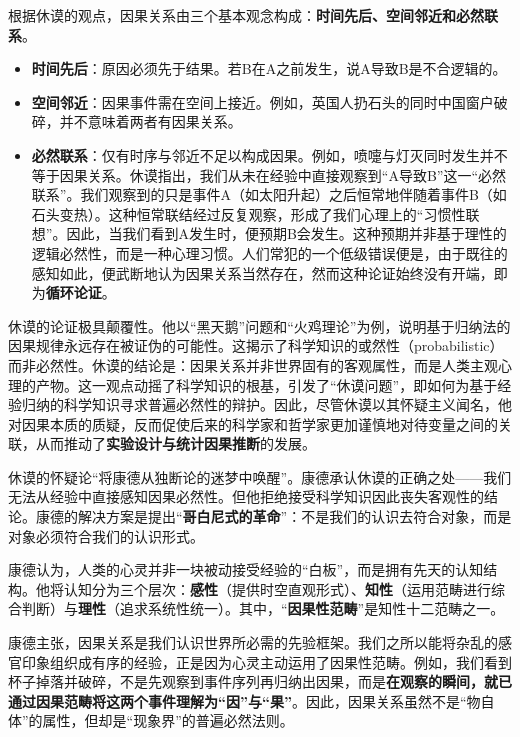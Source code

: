 根据休谟的观点，因果关系由三个基本观念构成：\textbf{时间先后、空间邻近和必然联系}。
	
\begin{itemize}
    \item
    \textbf{时间先后}：原因必须先于结果。若B在A之前发生，说A导致B是不合逻辑的。
    \item
    \textbf{空间邻近}：因果事件需在空间上接近。例如，英国人扔石头的同时中国窗户破碎，并不意味着两者有因果关系。
    \item
    \textbf{必然联系}：仅有时序与邻近不足以构成因果。例如，喷嚏与灯灭同时发生并不等于因果关系。休谟指出，我们从未在经验中直接观察到“A导致B”这一“必然联系”。我们观察到的只是事件A（如太阳升起）之后恒常地伴随着事件B（如石头变热）。这种恒常联结经过反复观察，形成了我们心理上的“习惯性联想”。因此，当我们看到A发生时，便预期B会发生。这种预期并非基于理性的逻辑必然性，而是一种心理习惯。人们常犯的一个低级错误便是，由于既往的感知如此，便武断地认为因果关系当然存在，然而这种论证始终没有开端，即为\textbf{循环论证}。
\end{itemize}

休谟的论证极具颠覆性。他以“黑天鹅”问题和“火鸡理论”为例，说明基于归纳法的因果规律永远存在被证伪的可能性。这揭示了科学知识的或然性（probabilistic）而非必然性。休谟的结论是：因果关系并非世界固有的客观属性，而是人类主观心理的产物。这一观点动摇了科学知识的根基，引发了“休谟问题”，即如何为基于经验归纳的科学知识寻求普遍必然性的辩护。因此，尽管休谟以其怀疑主义闻名，他对因果本质的质疑，反而促使后来的科学家和哲学家更加谨慎地对待变量之间的关联，从而推动了\textbf{实验设计与统计因果推断}的发展。

休谟的怀疑论“将康德从独断论的迷梦中唤醒”。康德承认休谟的正确之处——我们无法从经验中直接感知因果必然性。但他拒绝接受科学知识因此丧失客观性的结论。康德的解决方案是提出“\textbf{哥白尼式的革命}”：不是我们的认识去符合对象，而是对象必须符合我们的认识形式。\textsuperscript{\cite{6}}

康德认为，人类的心灵并非一块被动接受经验的“白板”，而是拥有先天的认知结构。他将认知分为三个层次：\textbf{感性}（提供时空直观形式）、\textbf{知性}（运用范畴进行综合判断）与\textbf{理性}（追求系统性统一）。其中，“\textbf{因果性范畴}”是知性十二范畴之一。

康德主张，因果关系是我们认识世界所必需的先验框架。我们之所以能将杂乱的感官印象组织成有序的经验，正是因为心灵主动运用了因果性范畴。例如，我们看到杯子掉落并破碎，不是先观察到事件序列再归纳出因果，而是\textbf{在观察的瞬间，就已通过因果范畴将这两个事件理解为“因”与“果”}。因此，因果关系虽然不是“物自体”的属性，但却是“现象界”的普遍必然法则。

